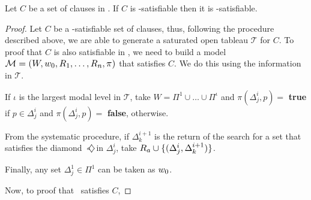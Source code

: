 \begin{theorem}
\label{completeness}
    Let $C$ be a set of clauses in . If $C$ is \ckn-satisfiable then it
    is -satisfiable.
\end{theorem}
\begin{proof}
    Let $C$ be a \ckn-satisfiable set of clauses, thus, following the procedure
    described above, we are able to generate a saturated open tableau
    $\mathcal{T}$ for $C$. To proof that $C$ is also satisfiable in
    , we need to build a model $\Model = (\St, \st_0, R_1, \ldots, R_n, \pi)$ that satisfies $C$. We do this
    using the information in $\mathcal{T}$.

    If $\iota$ is the largest modal level in $\mathcal{T}$, take $W = \Pi^1 \cup
    \ldots \cup \Pi^\iota$ and $\pi(\Delta^i_j, p) = $ \textbf{true} if $p \in
    \Delta^i_j$ and $\pi(\Delta^i_j, p) =$ \textbf{false}, otherwise.

    From the systematic procedure, if $\Delta^{i+1}_k$ is the return of the
    search for a set that satisfies the diamond $\pos{a}$ in $\Delta^i_j$, take
    $R_{\agent} \cup \{(\Delta^i_j, \Delta^{i+1}_k)\}$.

    Finally, any set $\Delta^1_j \in \Pi^1$ can be taken as $\st_0$.

    Now, to proof that \Model~satisfies $C$,
\end{proof}
